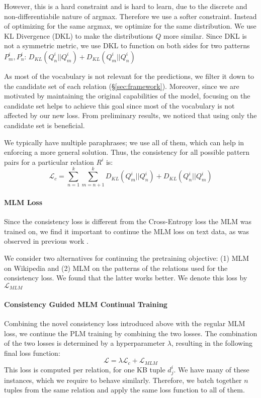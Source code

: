 However, this is a hard constraint and is hard to learn, due to the discrete and non-differentiabile nature of argmax. Therefore we use a softer constraint.
Instead of optimizing for the same argmax, we optimize for the same distribution.
We use KL Divergence (DKL) to make the distributions $Q$
more similar. Since DKL is not a symmetric metric, we use DKL to function on both sides for two patterns $P^i_m,P^i_n$:
$D_{KL}(Q^i_n||Q^i_m) + D_{KL} (Q^i_m||Q^i_n)$


As most of the vocabulary is not relevant for the
predictions, we filter it down to the candidate set of each relation (\S\ref{sec:framework}). Moreover, since we are motivated by maintaining the original capabilities of the model, focusing on the candidate set helps to achieve this goal since most of the vocabulary is not affected by our new loss.
From preliminary results, we noticed that using only the candidate set is beneficial.

We typically have multiple paraphrases; we use all of them, which can help in enforcing a more general solution. Thus, the consistency for all possible pattern pairs for a particular relation $R^i$ is:
\[
\mathcal{L}_{c} = \sum_{n=1}^k \sum_{m=n+1}^k D_{KL}(Q^i_m||Q^i_n) + D_{KL}(Q^i_n||Q^i_m)
\]


\paragraph{MLM Loss}
Since the consistency loss is different from the Cross-Entropy loss the MLM was trained on, we find it important to continue the MLM loss on text data, as was observed in previous work \cite{geva2020injecting}.

We consider two alternatives for continuing the pretraining objective: (1) MLM on Wikipedia and (2) MLM on the patterns of the relations used for the consistency loss. We found that the latter works better. We denote this loss by $\mathcal{L}_{MLM}$


\paragraph{Consistency Guided MLM Continual Training}

Combining the novel consistency loss introduced above with
the regular MLM loss, we continue the PLM training by
combining the two losses. The combination of the two losses
is determined by a hyperparameter $\lambda$, resulting in
the following final loss function:
\[
\mathcal{L} = \lambda \mathcal{L}_c + \mathcal{L}_{MLM}
\]
This loss is computed per relation, for one KB tuple $d_j^i$. We have many of these instances, which we require to behave similarly. Therefore, we batch together $n$ tuples from the same relation and apply the same loss function to all of them.




